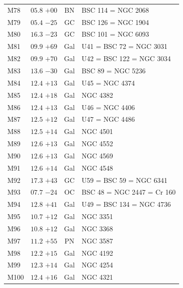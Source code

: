 \begin{table}[t]
\begin{tabularx}{\linewidth}{lccX}
M78  &$05.8$ $+00$&BN &BSC 114 = NGC 2068\\
M79  &$05.4$ $-25$&GC &BSC 126 = NGC 1904\\
M80  &$16.3$ $-23$&GC &BSC 101 = NGC 6093\\
M81  &$09.9$ $+69$&Gal&U41 = BSC 72 = NGC 3031\\
M82  &$09.9$ $+70$&Gal&U42 = BSC 122 = NGC 3034\\
M83  &$13.6$ $-30$&Gal&BSC 89 = NGC 5236\\
M84  &$12.4$ $+13$&Gal&U45 = NGC 4374\\
M85  &$12.4$ $+18$&Gal&NGC 4382\\
M86  &$12.4$ $+13$&Gal&U46 = NGC 4406\\
M87  &$12.5$ $+12$&Gal&U47 = NGC 4486\\
M88  &$12.5$ $+14$&Gal&NGC 4501\\
M89  &$12.6$ $+13$&Gal&NGC 4552\\
M90  &$12.6$ $+13$&Gal&NGC 4569\\
M91  &$12.6$ $+14$&Gal&NGC 4548\\
M92  &$17.3$ $+43$&GC &U59 = BSC 59 = NGC 6341\\
M93  &$07.7$ $-24$&OC &BSC 48 = NGC 2447 = Cr 160\\
M94  &$12.8$ $+41$&Gal&U49 = BSC 134 = NGC 4736\\
M95  &$10.7$ $+12$&Gal&NGC 3351\\
M96  &$10.8$ $+12$&Gal&NGC 3368\\
M97  &$11.2$ $+55$&PN &NGC 3587\\
M98  &$12.2$ $+15$&Gal&NGC 4192\\
M99  &$12.3$ $+14$&Gal&NGC 4254\\
M100 &$12.4$ $+16$&Gal&NGC 4321\\

        \hline
    \end{tabularx}
\end{table}
\clearpage


